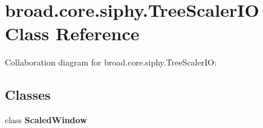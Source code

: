 \hypertarget{classbroad_1_1core_1_1siphy_1_1_tree_scaler_i_o}{\section{broad.\+core.\+siphy.\+Tree\+Scaler\+I\+O Class Reference}
\label{classbroad_1_1core_1_1siphy_1_1_tree_scaler_i_o}
}


Collaboration diagram for broad.\+core.\+siphy.\+Tree\+Scaler\+I\+O\+:
\subsection*{Classes}
\begin{DoxyCompactItemize}
\item 
class {\bfseries Scaled\+Window}
\end{DoxyCompactItemize}
